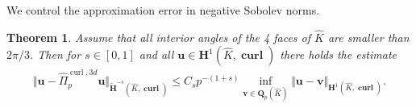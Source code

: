 \documentclass{article}
\newtheorem{theorem}{Theorem}[section]
\newcommand{\hatPicurlcom}{\widehat \Pi^{\operatorname*{curl},3d}_p}
\begin{document}
We control the approximation error in negative Sobolev norms.

\begin{theorem}
\label{thm:duality-again}
Assume that all interior angles of the 4 faces of $\widehat K$ are smaller than $2\pi/3$. Then 
for $s \in [0,1]$ and all $\mathbf{u}\in \mathbf{H}^1(\widehat{K},\operatorname{\mathbf{curl}})$ 
there holds the estimate
\begin{align*}
\Vert\mathbf{u}-\hatPicurlcom\mathbf{u}\Vert_{\widetilde{\mathbf{H}}^{-s}(\widehat{K},\operatorname{\mathbf{curl}})} 
\leq C_s p^{-(1+s)} \inf_{{\mathbf v} \in {\mathbf Q}_p(\widehat{K})} \Vert\mathbf{u} - \mathbf{v}\Vert_{\mathbf{H}^1(\widehat{K},\operatorname{\mathbf{curl}})}.
\end{align*}
\end{theorem}
\end{document}
